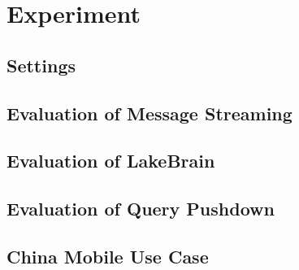 \section{Experiment} 
\label{sec:exp}


\subsection{Settings}

\subsection{Evaluation of Message Streaming}

\subsection{Evaluation of LakeBrain}

\subsection{Evaluation of Query Pushdown}


\subsection{China Mobile Use Case}